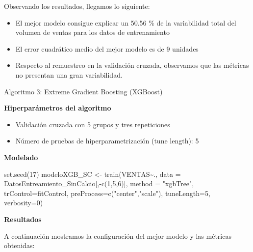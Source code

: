 \documentclass[
]{article}
\newenvironment{Shaded}{\begin{snugshade}}{\end{snugshade}}
\newcommand{\AttributeTok}[1]{\textcolor[rgb]{0.77,0.63,0.00}{#1}}
\newcommand{\DecValTok}[1]{\textcolor[rgb]{0.00,0.00,0.81}{#1}}
\newcommand{\FunctionTok}[1]{\textcolor[rgb]{0.00,0.00,0.00}{#1}}
\newcommand{\NormalTok}[1]{#1}
\newcommand{\OtherTok}[1]{\textcolor[rgb]{0.56,0.35,0.01}{#1}}
\newcommand{\SpecialCharTok}[1]{\textcolor[rgb]{0.00,0.00,0.00}{#1}}
\newcommand{\StringTok}[1]{\textcolor[rgb]{0.31,0.60,0.02}{#1}}
\providecommand{\tightlist}{%
  \setlength{\itemsep}{0pt}\setlength{\parskip}{0pt}}
\begin{document}
Observando los resultados, llegamos lo siguiente:

\begin{itemize}
\tightlist
\item
  El mejor modelo consigue explicar un 50.56 \% de la variabilidad total
  del volumen de ventas para los datos de entrenamiento
\item
  El error cuadrático medio del mejor modelo es de 9 unidades
\item
  Respecto al remuestreo en la validación cruzada, observamos que las
  métricas no presentan una gran variabilidad.
\end{itemize}

Algoritmo 3: Extreme Gradient Boosting (XGBoost)

\textbf{Hiperparámetros del algoritmo}

\begin{itemize}
\tightlist
\item
  Validación cruzada con 5 grupos y tres repeticiones
\item
  Número de pruebas de hiperparametrización (tune length): 5
\end{itemize}

\textbf{Modelado}

\begin{Shaded}
\begin{Highlighting}[]
\FunctionTok{set.seed}\NormalTok{(}\DecValTok{17}\NormalTok{)}
\NormalTok{modeloXGB\_SC }\OtherTok{\textless{}{-}} \FunctionTok{train}\NormalTok{(VENTAS}\SpecialCharTok{\textasciitilde{}}\NormalTok{., }
                \AttributeTok{data =}\NormalTok{ DatosEntreamiento\_SinCalcio[,}\SpecialCharTok{{-}}\FunctionTok{c}\NormalTok{(}\DecValTok{1}\NormalTok{,}\DecValTok{5}\NormalTok{,}\DecValTok{6}\NormalTok{)], }
                \AttributeTok{method =} \StringTok{"xgbTree"}\NormalTok{,}
                \AttributeTok{trControl=}\NormalTok{fitControl, }
                \AttributeTok{preProcess=}\FunctionTok{c}\NormalTok{(}\StringTok{"center"}\NormalTok{,}\StringTok{"scale"}\NormalTok{),}
                \AttributeTok{tuneLength=}\DecValTok{5}\NormalTok{,}
                \AttributeTok{verbosity=}\DecValTok{0}\NormalTok{)}
\end{Highlighting}
\end{Shaded}

\textbf{Resultados}

A continuación mostramos la configuración del mejor modelo y las
métricas obtenidas:
\end{document}

